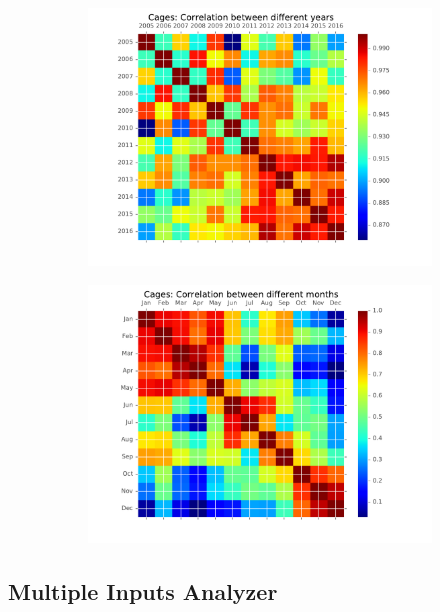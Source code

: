 \begin{figure}[H]
\begin{subfigure}{.5\textwidth}
	\centering
    \includegraphics[width=1\textwidth]{Files/Cages_Years_Matrix.pdf}
\end{subfigure}%
\begin{subfigure}{.5\textwidth}
	\centering
    \includegraphics[width=1\textwidth]{Files/Cages_Months_Matrix.pdf}
\end{subfigure}%
\end{figure}

\newpage

\subsection{Multiple Inputs Analyzer}
